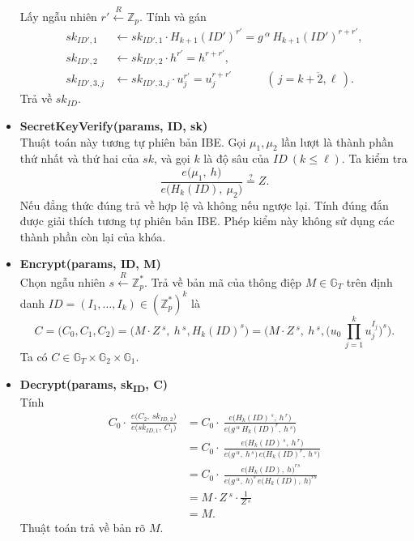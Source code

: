\documentclass[class=report, crop=false]{standalone}
\begin{document}
\begin{itemize}[leftmargin=1cm, itemindent=-1cm]
			Lấy ngẫu nhiên $r' \xleftarrow{R} \mathbb{Z}_p$. Tính và gán
			\begin{align*}
				sk_{ID', 1} &\leftarrow
					sk_{ID', 1} \cdot H_{k + 1}(ID')^{r'} =
					g\,^\alpha\, H_{k + 1}(ID')^{r + r'}, \\
				sk_{ID', 2} &\leftarrow sk_{ID', 2} \cdot h^{r'} = h^{r + r'}, \\
				sk_{ID', 3, j} &\leftarrow sk_{ID', 3, j} \cdot u_j^{r'} = u_j^{r + r'} \quad\quad\quad (\, j = \overline{k + 2, \ell}\,).
			\end{align*}
			Trả về $sk_{ID}$.
			\item[] {\sffamily\bfseries SecretKeyVerify(params, ID, sk)} \\
			Thuật toán này tương tự phiên bản IBE. Gọi $\mu_1, \mu_2$ lần lượt là thành phần thứ nhất và thứ hai của $sk$, và gọi $k$ là độ sâu của $ID \ (k \leq \ell)$. Ta kiểm tra
			\[
				\frac{e \Big(\mu_1,\ h \Big)}{e \Big(H_{k}(ID),\ \mu_2 \Big)} \overset{?}{=} Z.
			\]
			Nếu đẳng thức đúng trả về hợp lệ và không nếu ngược lại. Tính đúng đắn được giải thích tương tự phiên bản IBE. Phép kiểm này không sử dụng các thành phần còn lại của khóa.
			\item[] {\sffamily\bfseries Encrypt(params, ID, M)} \\
			Chọn ngẫu nhiên $s \xleftarrow{R} \mathbb{Z}_p^*$. Trả về bản mã của thông điệp $M \in \mathbb{G}_T$ trên định danh $ID = (I_1, \dots, I_k) \in (\mathbb{Z}_p^*)^k$ là
			\[
				C = \Big(C_0, C_1, C_2 \Big) = \Big(M \cdot Z\,^s,\ h\,^s, H_{k}(ID)^s \Big) = \Big(M \cdot Z\,^s,\ h\,^s, \Big(u_0 \, \prod_{j = 1}^k u_j^{I_j} \Big)^s \Big).
			\]
			Ta có $C \in \mathbb{G}_T \times \mathbb{G}_2 \times \mathbb{G}_1$.
			\item[] {\sffamily\bfseries Decrypt(params, sk\textsubscript{ID}, C)} \\
			Tính
			\begin{align*}
				C_0 \cdot\ \frac{e \Big(C_2,\ sk_{ID, 2} \Big)}{e \Big(sk_{ID, 1},\ C_1 \Big)} &=
				C_0 \cdot\ \frac{e \Big(H_{k}(ID)\,^s,\ h\,^r \Big)}{e \Big(g\,^\alpha\, H_{k}(ID)^r,\ h\,^s \Big)} \\ &=
				C_0 \cdot\ \frac{e \Big(H_{k}(ID)\,^s,\ h\,^r \Big)}{e \Big(g\,^\alpha,\ h\,^s \Big)\, e \Big(H_{k}(ID)^r,\ h\,^s \Big)} \\ &=
				C_0 \cdot\ \frac{e \Big(H_{k}(ID),\ h \Big)^{rs}}{e \Big(g\,^\alpha,\ h \Big)^s\, e \Big(H_{k}(ID),\ h \Big)^{rs}} \\ &=
				M \cdot Z\,^s \cdot \frac{1}{Z\,^s} \\
				&= M.
			\end{align*}
			Thuật toán trả về bản rõ $M$.
		\end{itemize}
\end{document}
